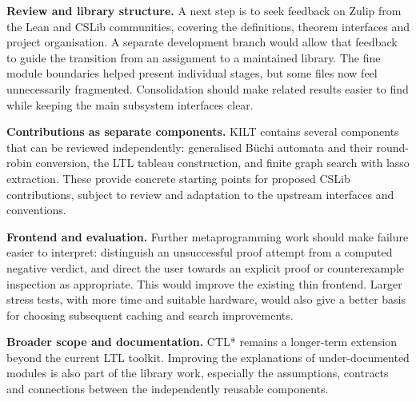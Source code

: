 \textbf{Review and library structure.}
A next step is to seek feedback on Zulip from the Lean and CSLib communities,
covering the definitions, theorem interfaces and project organisation. A
separate development branch would allow that feedback to guide the transition
from an assignment to a maintained library. The fine module boundaries helped
present individual stages, but some files now feel unnecessarily fragmented.
Consolidation should make related results easier to find while keeping the
main subsystem interfaces clear.

\textbf{Contributions as separate components.}
KILT contains several components that can be reviewed independently:
generalised B\"uchi automata and their round-robin conversion, the LTL tableau
construction, and finite graph search with lasso extraction. These provide
concrete starting points for proposed CSLib contributions, subject to review
and adaptation to the upstream interfaces and conventions.

\textbf{Frontend and evaluation.}
Further metaprogramming work should make failure easier to interpret:
distinguish an unsuccessful proof attempt from a computed negative verdict,
and direct the user towards an explicit proof or counterexample inspection
as appropriate. This would improve the existing thin frontend. Larger stress
tests, with more time and suitable hardware, would also give a better basis
for choosing subsequent caching and search improvements.

\textbf{Broader scope and documentation.}
CTL* remains a longer-term extension beyond the current LTL toolkit.
Improving the explanations of under-documented modules is also part of the
library work, especially the assumptions, contracts and connections between
the independently reusable components.

\clearpage
